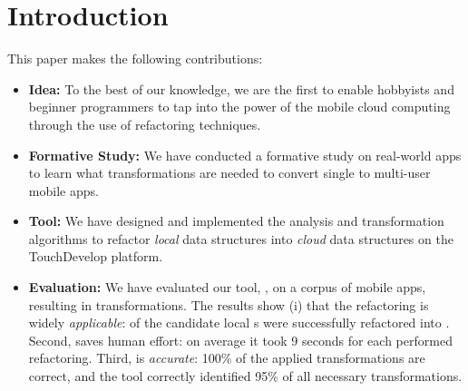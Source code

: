 \documentclass{sigplanconf}
\begin{document}
\section{Introduction}






This paper makes the following contributions:
\begin{itemize}
\item{\textbf{Idea:}} To the best of our knowledge, we are the first to enable hobbyists and beginner programmers to tap into the power of the mobile cloud
computing through the use of refactoring techniques.

\item{\textbf{Formative Study:}} We have conducted a formative study on \numFormative real-world apps to learn what transformations are needed to convert single to multi-user mobile apps. 

\item{\textbf{Tool:}} We have designed and implemented the analysis and transformation algorithms to refactor \emph{local} data structures into \emph{cloud} data structures on the TouchDevelop platform. 

\item{\textbf{Evaluation:}} We have evaluated our tool, \tool, on a corpus of \numScripts mobile apps, resulting in \numTransformations transformations. The results show (i) that the refactoring is widely \emph{applicable}: \percentRefactored of the candidate local s were successfully refactored into . Second, \tool saves human effort: on average it took 9 seconds for each performed refactoring. Third, \tool is  
\emph{accurate}: 100\% of the applied transformations are correct, and the tool correctly identified 95\% of all necessary transformations.  
\end{itemize}
\end{document}
